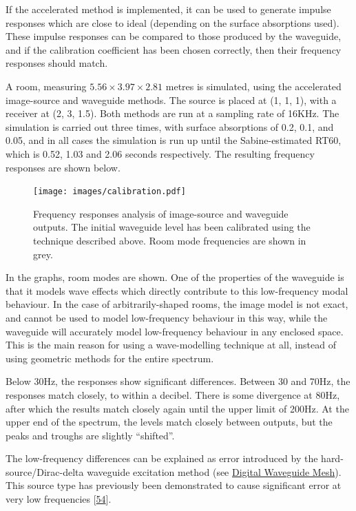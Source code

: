 \documentclass[]{scrreprt}
\begin{document}
If the accelerated method is implemented, it can be used to generate
impulse responses which are close to ideal (depending on the surface
absorptions used). These impulse responses can be compared to those
produced by the waveguide, and if the calibration coefficient has been
chosen correctly, then their frequency responses should match.

A room, measuring \(5.56 \times 3.97 \times 2.81\) metres is simulated,
using the accelerated image-source and waveguide methods. The source is
placed at (1, 1, 1), with a receiver at (2, 3, 1.5). Both methods are
run at a sampling rate of 16KHz. The simulation is carried out three
times, with surface absorptions of 0.2, 0.1, and 0.05, and in all cases
the simulation is run up until the Sabine-estimated RT60, which is 0.52,
1.03 and 2.06 seconds respectively. The resulting frequency responses
are shown below.

\begin{figure}[htbp]
\centering
\texttt{[image: images/calibration.pdf]}
\caption{Frequency responses analysis of image-source and waveguide
outputs. The initial waveguide level has been calibrated using the
technique described above. Room mode frequencies are shown in
grey.\label{fig:calibration}}
\end{figure}

In the graphs, room modes are shown. One of the properties of the
waveguide is that it models wave effects which directly contribute to
this low-frequency modal behaviour. In the case of arbitrarily-shaped
rooms, the image model is not exact, and cannot be used to model
low-frequency behaviour in this way, while the waveguide will accurately
model low-frequency behaviour in any enclosed space. This is the main
reason for using a wave-modelling technique at all, instead of using
geometric methods for the entire spectrum.

Below 30Hz, the responses show significant differences. Between 30 and
70Hz, the responses match closely, to within a decibel. There is some
divergence at 80Hz, after which the results match closely again until
the upper limit of 200Hz. At the upper end of the spectrum, the levels
match closely between outputs, but the peaks and troughs are slightly
``shifted''.

The low-frequency differences can be explained as error introduced by
the hard-source/Dirac-delta waveguide excitation method (see
\href{\%7B\%7B\%20site.baseurl\%20\%7D\%7D\%7B\%\%20link\%20waveguide.md\%20\%\%7D}{Digital
Waveguide Mesh}). This source type has previously been demonstrated to
cause significant error at very low frequencies
{[}\protect\hyperlink{ref-sheafferux5fphysicalux5f2014}{54}{]}.
\end{document}
